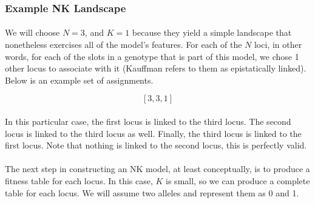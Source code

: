 \documentclass[12pt,letterpaper,titlepage]{article}
\begin{document}
\subsubsection{Example NK Landscape}

\paragraph{}
We will choose $N=3$, and $K=1$ because they yield a simple landscape that
nonetheless exercises all of the model's features. For each of the $N$ loci, in
other words, for each of the slots in a genotype that is part of this model, we
chose 1 other locus to associate with it (Kauffman refers to them as
epistatically linked). Below is an example set of assignments.

\begin{displaymath}
    \left[3,3,1\right]
\end{displaymath}

\paragraph{}
In this particular case, the first locus is linked to the third locus. The
second locus is linked to the third locus as well. Finally, the third locus is
linked to the first locus. Note that nothing is linked to the second locus,
this is perfectly valid.

\paragraph{}
The next step in constructing an NK model, at least conceptually, is to produce
a fitness table for each locus. In this case, $K$ is small, so we can produce a
complete table for each locus. We will assume two alleles and represent them as
0 and 1.
\end{document}
